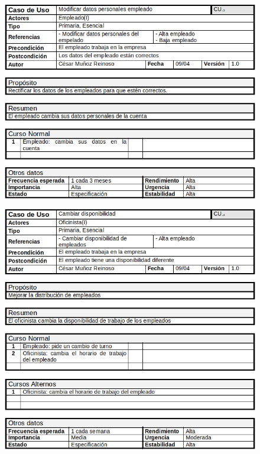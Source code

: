 \begin{figure}[H]
	\centering
	\includegraphics[width=16cm]{3}
\end{figure}
\begin{figure}[H]
	\centering
	\includegraphics[width=16cm]{4}
\end{figure}
